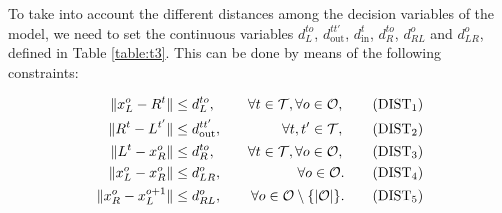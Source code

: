\noindent
To take into account the different distances among the decision variables of the model, we need to set the continuous variables $d_L^{to}$, $d_{\text{out}}^{tt'}$, $d_{\text{in}}^t$, $d_R^{to}$, $d_{RL}^o$ and $d_{LR}^o$, defined in Table \ref{table:t3}. This can be done by means of the following constraints:
 

\begin{align*}
\|x_L^o- R^t\| & \leq  d_L^{to},  &\quad \forall t\in\mathcal T, \forall o\in \mathcal O,\tag{DIST$_{1}$} \label{eq:d1}\\
\|R^{t}- L^{t'}\| & \leq  d_{\text{out}}^{tt'}, &\quad \forall t, t'\in\mathcal T, \tag{DIST$_{2}$} \label{eq:d2}\\
\|L^{t}- x_R^o\| & \leq  d_R^{to}, &\quad \forall t\in\mathcal T,\forall o\in \mathcal O, \tag{DIST$_{3}$} \label{eq:d3}\\
\|x_L^o- x_R^o\| & \leq  d_{LR}^o, & \quad \forall o\in \mathcal O. \tag{DIST$_{4}$} \label{eq:d4}\\
\|x_R^o- x_L^{o+1}\| & \leq  d_{RL}^o, & \quad \forall o\in \mathcal O\setminus\{|\mathcal O|\}. \tag{DIST$_{5}$} \label{eq:d6}\\
\end{align*}

